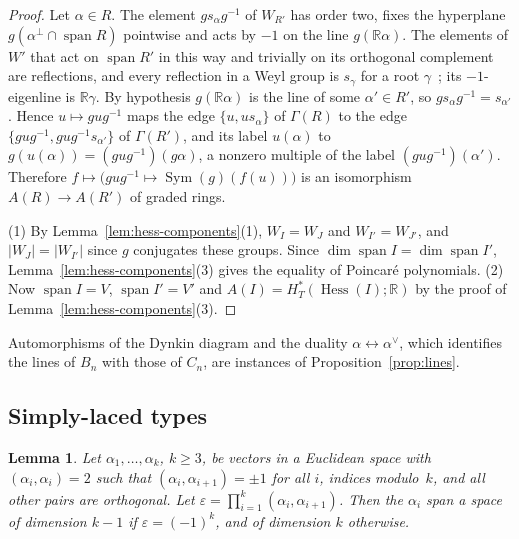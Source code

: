\documentclass[11pt,a4paper]{article}
\numberwithin{equation}{section}
\theoremstyle{plain}
\newtheorem{lemma}[theorem]{Lemma}
\theoremstyle{definition}
\theoremstyle{remark}
\newcommand{\R}{\mathbb{R}}
\newcommand{\HT}{H^{*}_{T}}
\DeclareMathOperator{\Hess}{Hess}
\DeclareMathOperator{\Sym}{Sym}
\DeclareMathOperator{\spn}{span}
\begin{document}
\begin{proof}
Let $\alpha\in R$. The element $gs_\alpha g^{-1}$ of $W_{R'}$ has order two, fixes the hyperplane $g(\alpha^\perp\cap\spn R)$ pointwise and acts by $-1$ on the line $g(\R\alpha)$. The elements of $W'$ that act on $\spn R'$ in this way and trivially on its orthogonal complement are reflections, and every reflection in a Weyl group is $s_\gamma$ for a root $\gamma$~\cite[§1.14]{Hum90}; its $-1$-eigenline is $\R\gamma$. By hypothesis $g(\R\alpha)$ is the line of some $\alpha'\in R'$, so $gs_\alpha g^{-1}=s_{\alpha'}$. Hence $u\mapsto gug^{-1}$ maps the edge $\{u,us_\alpha\}$ of $\Gamma(R)$ to the edge $\{gug^{-1},gug^{-1}s_{\alpha'}\}$ of $\Gamma(R')$, and its label $u(\alpha)$ to $g(u(\alpha))=(gug^{-1})(g\alpha)$, a nonzero multiple of the label $(gug^{-1})(\alpha')$. Therefore $f\mapsto\bigl(gug^{-1}\mapsto\Sym(g)(f(u))\bigr)$ is an isomorphism $A(R)\to A(R')$ of graded rings.

(1) By Lemma~\ref{lem:hess-components}(1), $W_I=W_J$ and $W_{I'}=W_{J'}$, and $|W_J|=|W_{I'}|$ since $g$ conjugates these groups. Since $\dim\spn I=\dim\spn I'$, Lemma~\ref{lem:hess-components}(3) gives the equality of Poincaré polynomials. (2) Now $\spn I=V$, $\spn I'=V'$ and $A(I)=\HT(\Hess(I);\R)$ by the proof of Lemma~\ref{lem:hess-components}(3).
\end{proof}

Automorphisms of the Dynkin diagram and the duality $\alpha\leftrightarrow\alpha^\vee$, which identifies the lines of $B_n$ with those of $C_n$, are instances of Proposition~\ref{prop:lines}.

\subsection{Simply-laced types}

\begin{lemma}\label{lem:cycles}
Let $\alpha_1,\dots,\alpha_k$, $k\geqslant3$, be vectors in a Euclidean space with $(\alpha_i,\alpha_i)=2$ such that $(\alpha_i,\alpha_{i+1})=\pm1$ for all $i$, indices modulo~$k$, and all other pairs are orthogonal. Let $\varepsilon=\prod_{i=1}^k(\alpha_i,\alpha_{i+1})$. Then the $\alpha_i$ span a space of dimension $k-1$ if $\varepsilon=(-1)^k$, and of dimension $k$ otherwise.
\end{lemma}
\end{document}
